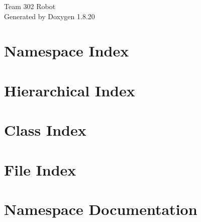 \let\mypdfximage\pdfximage\def\pdfximage{\immediate\mypdfximage}\documentclass[twoside]{book}
\newcommand{\+}{\discretionary{\mbox{\scriptsize$\hookleftarrow$}}{}{}}
\newcommand{\clearemptydoublepage}{%
  \newpage{\pagestyle{empty}\cleardoublepage}%
}
\begin{document}
\hypersetup{pageanchor=false,
             bookmarksnumbered=true,
             pdfencoding=unicode
            }
\begin{titlepage}
\vspace*{7cm}
\begin{center}%
{\Large Team 302 Robot }\\
\vspace*{1cm}
{\large Generated by Doxygen 1.8.20}\\
\end{center}
\end{titlepage}
\clearemptydoublepage
{}
\tableofcontents
\clearemptydoublepage
{}
\hypersetup{pageanchor=true}

\chapter{Namespace Index}

\chapter{Hierarchical Index}

\chapter{Class Index}

\chapter{File Index}

\chapter{Namespace Documentation}






\end{document}
